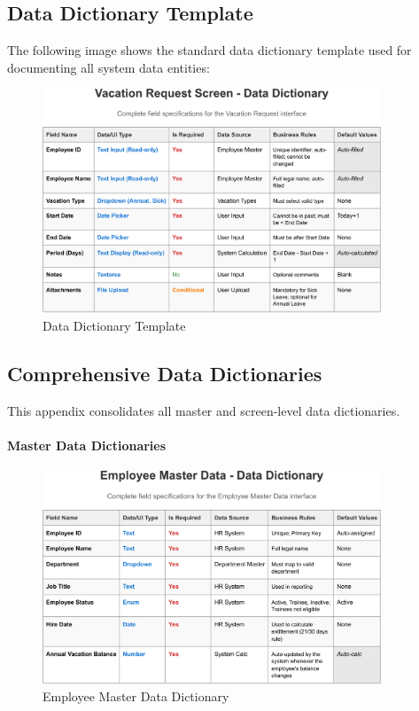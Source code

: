 \documentclass[12pt,a4paper]{article}
\begin{document}
\subsection{Data Dictionary Template}
The following image shows the standard data dictionary template used for documenting all system data entities:

\begin{figure}[H]
\centering
\includegraphics[width=0.9\textwidth]{Data-Dictionary/Data-Dictionary-Template/Data-Dictionary-Template-1.png}
\caption{Data Dictionary Template}
\label{fig:data-dictionary-template}
\end{figure}

\subsection{Comprehensive Data Dictionaries}
This appendix consolidates all master and screen-level data dictionaries.

\paragraph{Master Data Dictionaries}
\begin{figure}[H]
\centering
\includegraphics[width=0.9\textwidth]{Data-Dictionary/Master-Data-Dictionaries/Employee-Master-Data-Data-Dictionary/Employee-Master-Data-Data-Dictionary-1.png}
\caption{Employee Master Data Dictionary}
\label{fig:employee-master-data}
\end{figure}
\end{document}
